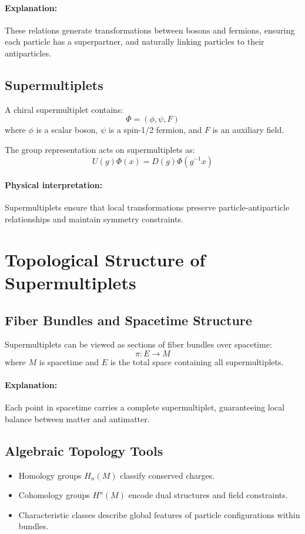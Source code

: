 \documentclass[12pt,a4paper]{article}
\begin{document}
\paragraph{Explanation:} These relations generate transformations between bosons and fermions, ensuring each particle has a superpartner, and naturally linking particles to their antiparticles.

\subsection{Supermultiplets}
A chiral supermultiplet contains:
\[
\Phi = (\phi, \psi, F)
\]
where \(\phi\) is a scalar boson, \(\psi\) is a spin-1/2 fermion, and \(F\) is an auxiliary field.  

The group representation acts on supermultiplets as:
\begin{equation}
U(g) \Phi(x) = D(g) \Phi(g^{-1} x)
\end{equation}

\paragraph{Physical interpretation:} Supermultiplets ensure that local transformations preserve particle-antiparticle relationships and maintain symmetry constraints.

\section{Topological Structure of Supermultiplets}
\subsection{Fiber Bundles and Spacetime Structure}
Supermultiplets can be viewed as sections of fiber bundles over spacetime:
\begin{equation}
\pi: E \to M
\end{equation}
where \(M\) is spacetime and \(E\) is the total space containing all supermultiplets.

\paragraph{Explanation:} Each point in spacetime carries a complete supermultiplet, guaranteeing local balance between matter and antimatter.

\subsection{Algebraic Topology Tools}
\begin{itemize}
    \item Homology groups \(H_n(M)\) classify conserved charges.  
    \item Cohomology groups \(H^n(M)\) encode dual structures and field constraints.  
    \item Characteristic classes describe global features of particle configurations within bundles.  
\end{itemize}
\end{document}
